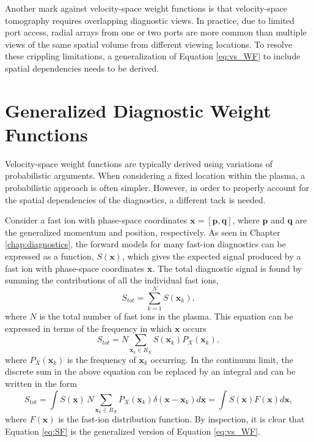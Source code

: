 Another mark against velocity-space weight functions is that velocity-space tomography requires overlapping diagnostic views.
In practice, due to limited port access, radial arrays from one or two ports are more common than multiple views of the same spatial volume from different viewing locations. 
To resolve these crippling limitations, a generalization of Equation \ref{eq:vs_WF} to include spatial dependencies needs to be derived.

\section{Generalized Diagnostic Weight Functions} \label{sec:generalized_weight}
Velocity-space weight functions are typically derived using variations of probabilistic arguments\cite{salewski2011,salewski2014,jacobsen2015,salewski2015,salewski2015}. When considering a fixed location within the plasma, a probabilistic approach is often simpler. However, in order to properly account for the spatial dependencies of the diagnostics, a different tack is needed.

Consider a fast ion with phase-space coordinates $\mathbf{x} = [\mathbf{p},\mathbf{q}]$, where $\mathbf{p}$ and $\mathbf{q}$ are the generalized momentum and position, respectively.
As seen in Chapter \ref{chap:diagnostics}, the forward models for many fast-ion diagnostics can be expressed as a function, $S(\mathbf{x})$, which gives the expected signal produced by a fast ion with phase-space coordinates $\mathbf{x}$.
The total diagnostic signal is found by summing the contributions of all the individual fast ions,
\begin{equation}\label{eq:sum_S}
    S_{tot} = \sum_{k=1}^N S(\mathbf{x}_k),
\end{equation}
where $N$ is the total number of fast ions in the plasma.
This equation can be expressed in terms of the frequency in which $\mathbf{x}$ occurs
\begin{equation}\label{eq:sum_SP}
    S_{tot} = N \sum_{\mathbf{x}_k \in R_{X}} S(\mathbf{x}_k) P_X(\mathbf{x}_k),
\end{equation}
where $P_X(\mathbf{x}_k)$ is the frequency of $\mathbf{x}_k$ occurring.
In the continuum limit, the discrete sum in the above equation can be replaced by an integral and can be written in the form
\begin{equation}\label{eq:SF}
    S_{tot} = \int S(\mathbf{x})\,N \sum_{\mathbf{x}_k \in R_{X}} P_X(\mathbf{x}_k) \delta(\mathbf{x} - \mathbf{x}_k) d\mathbf{x} = \int S(\mathbf{x}) F(\mathbf{x}) d\mathbf{x},
\end{equation}
where $F(\mathbf{x})$ is the fast-ion distribution function.
By inspection, it is clear that Equation \ref{eq:SF} is the generalized version of Equation \ref{eq:vs_WF}.


